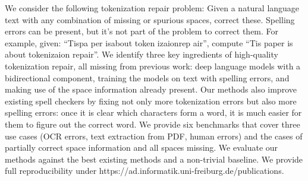 We consider the following tokenization repair problem: Given a natural language text with any combination of missing or spurious spaces, correct these. Spelling errors can be present, but it's not part of the problem to correct them. For example, given: ``Tispa per isabout token izaionrep air'', compute ``Tis paper is about tokenizaion repair''. We identify three key ingredients of high-quality tokenization repair, all missing from previous work: deep language models with a bidirectional component, training the models on text with spelling errors, and making use of the space information already present. Our methods also improve existing spell checkers by fixing not only more tokenization errors but also more spelling errors: once it is clear which characters form a word, it is much easier for them to figure out the correct word. We provide six benchmarks that cover three use cases (OCR errors, text extraction from PDF, human errors) and the cases of partially correct space information and all spaces missing. We evaluate our methods against the best existing methods and a non-trivial baseline. We provide full reproducibility under https://ad.informatik.uni-freiburg.de/publications.
